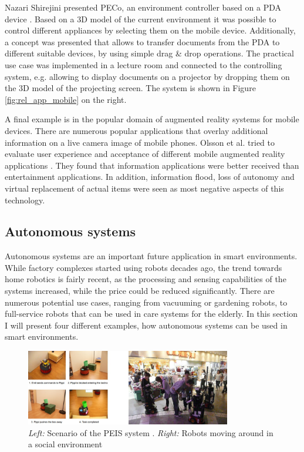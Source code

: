 Nazari Shirejini presented PECo, an environment controller based on a PDA device \cite{shirehjini2004novel}. Based on a 3D model of the current environment it was possible to control different appliances by selecting them on the mobile device. Additionally, a concept was presented that allows to transfer documents from the PDA to different suitable devices, by using simple drag \& drop operations. The practical use case was implemented in a lecture room and connected to the controlling system, e.g. allowing to display documents on a projector by dropping them on the 3D model of the projecting screen. The system is shown in Figure \ref{fig:rel_app_mobile} on the right.

A final example is in the popular domain of augmented reality systems for mobile devices. There are numerous popular applications that overlay additional information on a live camera image of mobile phones. Olsson et al. tried to evaluate user experience and acceptance of different mobile augmented reality applications \cite{olsson2012user}. They found that information applications were better received than entertainment applications. In addition, information flood, loss of autonomy and virtual replacement of actual items were seen as most negative aspects of this technology.


\subsection{Autonomous systems}
Autonomous systems are an important future application in smart environments. While factory complexes started using robots decades ago, the trend towards home robotics is fairly recent, as the processing and sensing capabilities of the systems increased, while the price could be reduced significantly. There are numerous potential use cases, ranging from vacuuming or gardening robots, to full-service robots that can be used in care systems for the elderly. In this section I will present four different examples, how autonomous systems can be used in smart environments.

\begin{figure}[ht]
\centering
\includegraphics[width=0.8\textwidth]{images/rel_app_robots}
\caption{\emph{Left:} Scenario of the PEIS system \cite{broxvall2006peis}. \emph{Right:} Robots moving around in a social environment \cite{glas2009simultaneous}}
\label{fig:rel_app_robots}
\end{figure}

